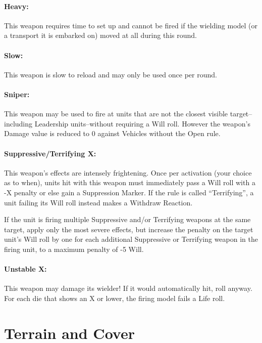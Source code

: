 \begin{multicols}{2}
\subsubsection*{Heavy:} This weapon requires time to set up and cannot be fired if the wielding model (or a transport it is embarked on) moved at all during this round.

\subsubsection*{Slow:} This weapon is slow to reload and may only be used once per round.

\subsubsection*{Sniper:} This weapon may be used to fire at units that are not the closest visible target--including Leadership units--without requiring a Will roll. However the weapon's Damage value is reduced to 0 against Vehicles without the Open rule.

\subsubsection*{Suppressive/Terrifying X:} This weapon's effects are intensely frightening. Once per activation (your choice as to when), units hit with this weapon must immediately pass a Will roll with a -X penalty or else gain a Suppression Marker. If the rule is called ``Terrifying'', a unit failing its Will roll instead makes a Withdraw Reaction.

If the unit is firing multiple Suppressive and/or Terrifying weapons at the same target, apply only the most severe effects, but increase the penalty on the target unit's Will roll by one for each additional Suppressive or Terrifying weapon in the firing unit, to a maximum penalty of -5 Will.

\subsubsection*{Unstable X:} This weapon may damage its wielder! If it would automatically hit, roll anyway. For each die that shows an X or lower, the firing model fails a Life roll.




\chapter*{Terrain and Cover}


\end{multicols}
